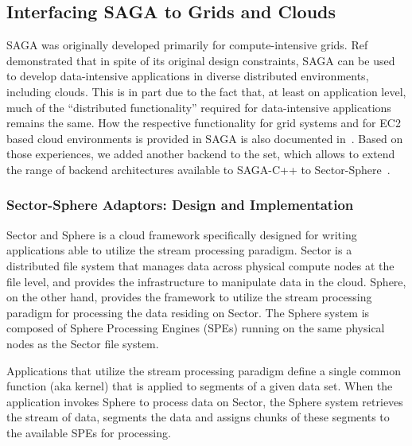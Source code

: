 \documentclass[graybox]{svmult}
\begin{document}
\subsection{Interfacing SAGA to Grids and Clouds}

SAGA was originally developed primarily for compute-intensive grids.
Ref~\cite{saga_ccgrid09} demonstrated that in spite of its original
design constraints, SAGA can be used to develop data-intensive
applications in diverse distributed environments, including clouds.
This is in part due to the fact that, at least on application level,
much of the ``distributed functionality'' required for data-intensive
applications remains the same.  How the respective functionality for
grid systems and for EC2 based cloud environments is provided in SAGA
is also documented in~\cite{saga_ccgrid09}.  Based on those
experiences, we added another backend to the set, which allows to
extend the range of backend architectures available to SAGA-C++ to
Sector-Sphere~\cite{sectorsphere09}.



\subsubsection{Sector-Sphere Adaptors: Design and Implementation}

Sector and Sphere is a cloud framework specifically designed for
writing applications able to utilize the stream processing paradigm.
Sector is a distributed file system that manages data across physical
compute nodes at the file level, and provides the infrastructure to
manipulate data in the cloud.  Sphere, on the other hand, provides the
framework to utilize the stream processing paradigm for processing the
data residing on Sector.  The Sphere system is composed of Sphere
Processing Engines (SPEs) running on the same physical nodes as the
Sector file system.

Applications that utilize the stream processing paradigm define a
single common function (aka kernel) that is applied to segments of a
given data set.  When the application invokes Sphere to process data
on Sector, the Sphere system retrieves the stream of data, segments
the data and assigns chunks of these segments to the available SPEs
for processing.
\end{document}
